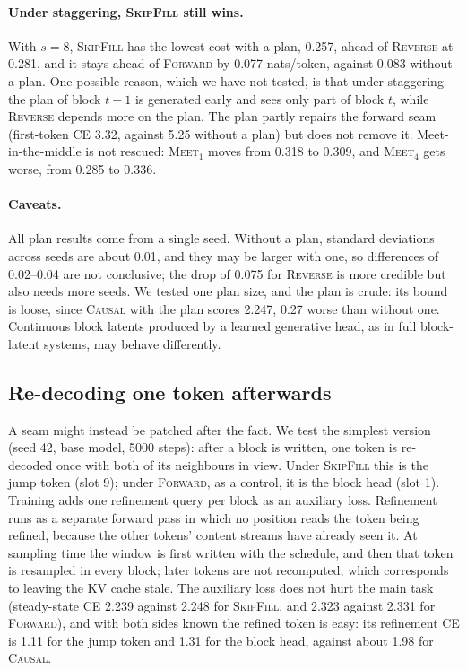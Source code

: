 \documentclass{article}
\theoremstyle{definition}
\theoremstyle{remark}
\newcommand{\name}[1]{\textup{\textsc{#1}}}
\newcommand{\sfill}{\name{SkipFill}\xspace}
\newcommand{\rev}{\name{Reverse}\xspace}
\newcommand{\fwd}{\name{Forward}\xspace}
\newcommand{\causal}{\name{Causal}\xspace}
\newcommand{\meet}[1]{\name{Meet}$_{#1}$}
\begin{document}
\paragraph{Under staggering, \sfill still wins.}
With $s=8$, \sfill has the lowest cost with a plan, 0.257, ahead of \rev at 0.281, and it stays ahead of \fwd by 0.077 nats/token, against 0.083 without a plan.
One possible reason, which we have not tested, is that under staggering the plan of block $t+1$ is generated early and sees only part of block $t$, while \rev depends more on the plan.
The plan partly repairs the forward seam (first-token CE 3.32, against 5.25 without a plan) but does not remove it.
Meet-in-the-middle is not rescued: \meet{1} moves from 0.318 to 0.309, and \meet{4} gets worse, from 0.285 to 0.336.

\paragraph{Caveats.}
All plan results come from a single seed.
Without a plan, standard deviations across seeds are about 0.01, and they may be larger with one, so differences of 0.02--0.04 are not conclusive; the drop of 0.075 for \rev is more credible but also needs more seeds.
We tested one plan size, and the plan is crude: its bound is loose, since \causal with the plan scores 2.247, 0.27 worse than without one.
Continuous block latents produced by a learned generative head, as in full block-latent systems, may behave differently.

\subsection{Re-decoding one token afterwards}
\label{app:refine}

A seam might instead be patched after the fact.
We test the simplest version (seed 42, base model, 5000 steps): after a block is written, one token is re-decoded once with both of its neighbours in view.
Under \sfill this is the jump token (slot 9); under \fwd, as a control, it is the block head (slot 1).
Training adds one refinement query per block as an auxiliary loss.
Refinement runs as a separate forward pass in which no position reads the token being refined, because the other tokens' content streams have already seen it.
At sampling time the window is first written with the schedule, and then that token is resampled in every block; later tokens are not recomputed, which corresponds to leaving the KV cache stale.
The auxiliary loss does not hurt the main task (steady-state CE 2.239 against 2.248 for \sfill, and 2.323 against 2.331 for \fwd), and with both sides known the refined token is easy: its refinement CE is 1.11 for the jump token and 1.31 for the block head, against about 1.98 for \causal.
\end{document}
